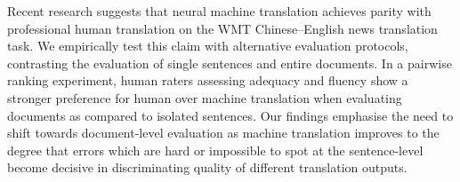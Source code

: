 Recent research suggests that neural machine translation achieves parity with professional human translation on the WMT Chinese--English news translation task. We empirically test this claim with alternative evaluation protocols, contrasting the evaluation of single sentences and entire documents. In a pairwise ranking experiment, human raters assessing adequacy and fluency show a stronger preference for human over machine translation when evaluating documents as compared to isolated sentences. Our findings emphasise the need to shift towards document-level evaluation as machine translation improves to the degree that errors which are hard or impossible to spot at the sentence-level become decisive in discriminating quality of different translation outputs.
